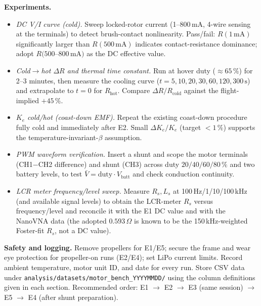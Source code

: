 \documentclass[a4paper,11pt]{ltjsarticle}
\begin{document}
\textbf{Experiments.}
\begin{itemize}
  \item[\textbf{E1}] \emph{DC V/I curve (cold).} Sweep locked-rotor current
    (1--800\,mA, 4-wire sensing at the terminals) to detect brush-contact nonlinearity.
    Pass/fail: $R(1\,\mathrm{mA})$ significantly larger than $R(500\,\mathrm{mA})$ indicates
    contact-resistance dominance; adopt $R(500$--$800\,\mathrm{mA})$ as the DC effective value.
  \item[\textbf{E2}] \emph{Cold$\to$hot $\Delta R$ and thermal time constant.} Run at hover
    duty ($\approx 65\,\%$) for 2--3 minutes, then measure the cooling curve
    ($t=5,10,20,30,60,120,300\,\mathrm{s}$) and extrapolate to $t=0$ for $R_\mathrm{hot}$.
    Compare $\Delta R/R_\mathrm{cold}$ against the flight-implied $+45\,\%$.
  \item[\textbf{E3}] \emph{$K_e$ cold/hot (coast-down EMF).} Repeat the existing coast-down
    procedure fully cold and immediately after E2. Small $\Delta K_e/K_e$ (target
    $<1\,\%$) supports the temperature-invariant-$\beta$ assumption.
  \item[\textbf{E4}] \emph{PWM waveform verification.} Insert a shunt and scope the motor
    terminals (CH1$-$CH2 difference) and shunt (CH3) across duty $20/40/60/80\,\%$ and two
    battery levels, to test $\bar V = \mathrm{duty}\cdot V_\mathrm{batt}$ and check conduction
    continuity.
  \item[\textbf{E5}] \emph{LCR meter frequency/level sweep.} Measure $R_s, L_s$ at
    100\,Hz/1/10/100\,kHz (and available signal levels) to obtain the LCR-meter $R_s$ versus
    frequency/level and reconcile it with the E1 DC value and with the NanoVNA data (the adopted
    $0.593\,\Omega$ is known to be the 150\,kHz-weighted Foster-fit $R_s$, not a DC value).
\end{itemize}

\textbf{Safety and logging.} Remove propellers for E1/E5; secure the frame and wear eye
protection for propeller-on runs (E2/E4); set LiPo current limits. Record ambient temperature,
motor unit ID, and date for every run. Store CSV data under
\texttt{analysis/datasets/motor\_bench\_YYYYMMDD/} using the column definitions given in each
section. Recommended order: E1 $\to$ E2 $\to$ E3 (same session) $\to$ E5 $\to$ E4 (after shunt
preparation).
\end{document}
